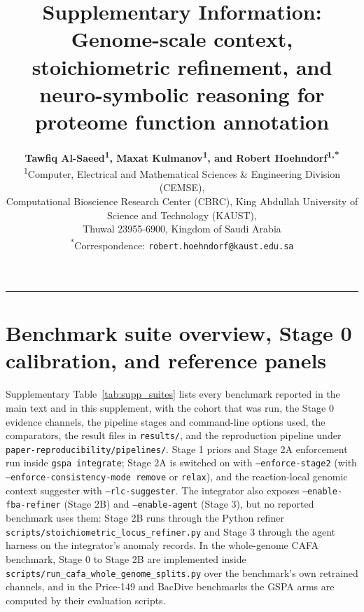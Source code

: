 \documentclass[10pt]{article}
\title{\textbf{\sffamily Supplementary Information:\\Genome-scale context, stoichiometric refinement, and neuro-symbolic reasoning for proteome function annotation}}
\author{
  \textbf{Tawfiq Al-Saeed\textsuperscript{1}, Maxat Kulmanov\textsuperscript{1}, and Robert Hoehndorf\textsuperscript{1,*}}\\[4pt]
  \small \textsuperscript{1}Computer, Electrical and Mathematical Sciences \& Engineering Division (CEMSE),\\
  \small Computational Bioscience Research Center (CBRC), King Abdullah University of Science and Technology (KAUST),\\
  \small Thuwal 23955-6900, Kingdom of Saudi Arabia\\[2pt]
  \small \textsuperscript{*}Correspondence: \texttt{robert.hoehndorf@kaust.edu.sa}
}
\date{}
\newcommand{\fn}[1]{\nolinkurl{#1}}
\begin{document}
\maketitle

\tableofcontents
\vspace{1em}
\hrule
\vspace{1em}

\section{Benchmark suite overview, Stage 0 calibration, and reference panels}
\label{sec:supp_suites}

Supplementary Table~\ref{tab:supp_suites} lists every benchmark reported in the main text and in this supplement, with the cohort that was run, the Stage 0 evidence channels, the pipeline stages and command-line options used, the comparators, the result files in \fn{results/}, and the reproduction pipeline under \fn{paper-reproducibility/pipelines/}. Stage 1 priors and Stage 2A enforcement run inside \texttt{gspa integrate}; Stage 2A is switched on with \texttt{--enforce-stage2} (with \texttt{--enforce-consistency-mode remove} or \texttt{relax}), and the reaction-local genomic context suggester with \texttt{--rlc-suggester}. The integrator also exposes \texttt{--enable-fba-refiner} (Stage 2B) and \texttt{--enable-agent} (Stage 3), but no reported benchmark uses them: Stage 2B runs through the Python refiner \fn{scripts/stoichiometric_locus_refiner.py} and Stage 3 through the agent harness on the integrator's anomaly records. In the whole-genome CAFA benchmark, Stage 0 to Stage 2B are implemented inside \fn{scripts/run_cafa_whole_genome_splits.py} over the benchmark's own retrained channels, and in the Price-149 and BacDive benchmarks the GSPA arms are computed by their evaluation scripts.
\end{document}
